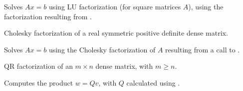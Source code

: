 \documentclass[letterpaper,10pt,english]{sphinxmanual}
\begin{document}

\begin{fulllineitems}
\label{linear_solvers/DLS:c.denseGETRF}
Solves \(Ax = b\) using LU factorization (for square matrices
\(A\)), using the factorization resulting from {\hyperref[linear_solvers/DLS:c.DenseGETRF]{\emph{}}}.

\end{fulllineitems}


\begin{fulllineitems}
\label{linear_solvers/DLS:c.DensePOTRF}
Cholesky factorization of a real symmetric positive definite dense matrix.

\end{fulllineitems}


\begin{fulllineitems}
\label{linear_solvers/DLS:c.DensePOTRS}
Solves \(Ax = b\) using the Cholesky factorization of \(A\)
resulting from a call to {\hyperref[linear_solvers/DLS:c.DensePOTRF]{\emph{}}}.

\end{fulllineitems}


\begin{fulllineitems}
\label{linear_solvers/DLS:c.DenseGEQRF}
QR factorization of an \(m \times n\) dense matrix, with \(m \ge n\).

\end{fulllineitems}


\begin{fulllineitems}
\label{linear_solvers/DLS:c.DenseORMQR}
Computes the product \(w = Qv\), with \(Q\) calculated
using {\hyperref[linear_solvers/DLS:c.DenseGEQRF]{\emph{}}}.

\end{fulllineitems}
\end{document}

